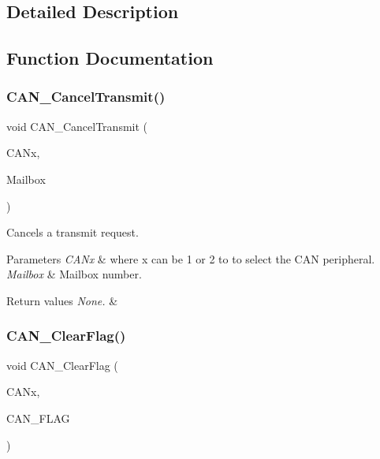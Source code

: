 \subsection{Detailed Description}


\subsection{Function Documentation}
\mbox{\label{group___c_a_n___exported___functions_ga81106cdf5395a1947bfc87ec1685829e}} 
\subsubsection{\texorpdfstring{CAN\_CancelTransmit()}{CAN\_CancelTransmit()}}
{\footnotesize\ttfamily void C\+A\+N\+\_\+\+Cancel\+Transmit (\begin{DoxyParamCaption}\item[{\mbox{\hyperlink{struct_c_a_n___type_def}{C\+A\+N\+\_\+\+Type\+Def}} $\ast$}]{C\+A\+Nx,  }\item[{uint8\+\_\+t}]{Mailbox }\end{DoxyParamCaption})}



Cancels a transmit request. 


\begin{DoxyParams}{Parameters}
{\em C\+A\+Nx} & where x can be 1 or 2 to to select the C\+AN peripheral. \\
\hline
{\em Mailbox} & Mailbox number. \\
\hline
\end{DoxyParams}

\begin{DoxyRetVals}{Return values}
{\em None.} & \\
\hline
\end{DoxyRetVals}
\mbox{\label{group___c_a_n___exported___functions_ga2c01646d5d3a2d7045e8dd71f58f8742}} 
\subsubsection{\texorpdfstring{CAN\_ClearFlag()}{CAN\_ClearFlag()}}
{\footnotesize\ttfamily void C\+A\+N\+\_\+\+Clear\+Flag (\begin{DoxyParamCaption}\item[{\mbox{\hyperlink{struct_c_a_n___type_def}{C\+A\+N\+\_\+\+Type\+Def}} $\ast$}]{C\+A\+Nx,  }\item[{uint32\+\_\+t}]{C\+A\+N\+\_\+\+F\+L\+AG }\end{DoxyParamCaption})}



